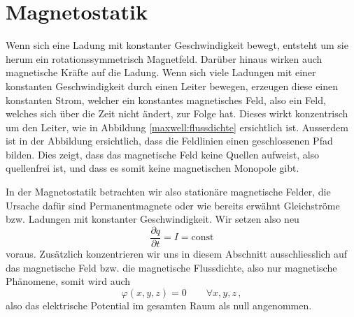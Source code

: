 %
%
%
%
\section{Magnetostatik\label{maxwell:magnetostatik}}


Wenn sich eine Ladung mit konstanter Geschwindigkeit bewegt, entsteht um sie herum ein rotationssymmetrisch Magnetfeld. Darüber hinaus wirken auch magnetische Kräfte auf die Ladung.
Wenn sich viele Ladungen mit einer konstanten Geschwindigkeit durch einen Leiter bewegen, erzeugen diese einen konstanten Strom, welcher ein konstantes magnetisches Feld, also ein Feld, welches sich über die Zeit nicht ändert, zur Folge hat. Dieses wirkt konzentrisch um den Leiter, wie in Abbildung \ref{maxwell:flussdichte} ersichtlich ist. Ausserdem ist in der Abbildung ersichtlich, dass die Feldlinien einen geschlossenen Pfad bilden. Dies zeigt, dass das magnetische Feld keine Quellen aufweist, also quellenfrei ist, und dass es somit keine magnetischen Monopole gibt.

In der Magnetostatik betrachten wir also stationäre magnetische Felder, die Ursache dafür sind Permanentmagnete oder wie bereits erwähnt Gleichströme bzw. Ladungen mit konstanter Geschwindigkeit.
Wir setzen also neu
\[ 
\frac{\partial q}{\partial t}
=
I
=
\text{const}
\]
voraus.
Zusätzlich konzentrieren wir uns in diesem Abschnitt ausschliesslich auf das magnetische Feld bzw. die magnetische Flussdichte, also nur magnetische Phänomene, somit wird auch
\[\varphi(x,y,z) = 0 \qquad \forall x,y,z\, ,\] 
also das elektrische Potential im gesamten Raum als null angenommen. 



